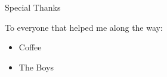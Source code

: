 \documentclass[../main.tex]{subfiles}
\begin{document}
    {\Huge Special Thanks}
    
    To everyone that helped me along the way:
    \begin{itemize}
        \item Coffee
        \item The Boys
    \end{itemize}
\end{document}
